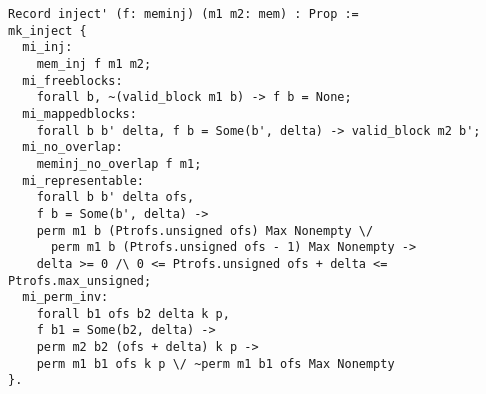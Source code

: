 \begin{lstlisting}[basicstyle=\footnotesize]
Record inject' (f: meminj) (m1 m2: mem) : Prop :=
mk_inject {
  mi_inj:
    mem_inj f m1 m2;
  mi_freeblocks:
    forall b, ~(valid_block m1 b) -> f b = None;
  mi_mappedblocks:
    forall b b' delta, f b = Some(b', delta) -> valid_block m2 b';
  mi_no_overlap:
    meminj_no_overlap f m1;
  mi_representable:
    forall b b' delta ofs,
    f b = Some(b', delta) ->
    perm m1 b (Ptrofs.unsigned ofs) Max Nonempty \/
      perm m1 b (Ptrofs.unsigned ofs - 1) Max Nonempty ->
    delta >= 0 /\ 0 <= Ptrofs.unsigned ofs + delta <= Ptrofs.max_unsigned;
  mi_perm_inv:
    forall b1 ofs b2 delta k p,
    f b1 = Some(b2, delta) ->
    perm m2 b2 (ofs + delta) k p ->
    perm m1 b1 ofs k p \/ ~perm m1 b1 ofs Max Nonempty
}.
\end{lstlisting}
